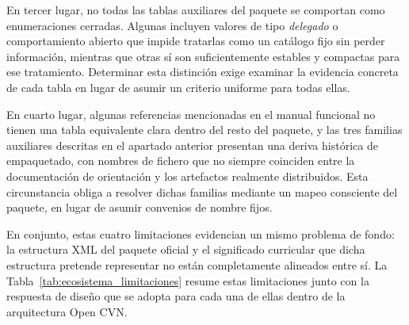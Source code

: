 En tercer lugar, no todas las tablas auxiliares del paquete se comportan como
enumeraciones cerradas. Algunas incluyen valores de tipo \emph{delegado} o
comportamiento abierto que impide tratarlas como un catálogo fijo sin perder
información, mientras que otras sí son suficientemente estables y compactas
para ese tratamiento. Determinar esta distinción exige examinar la evidencia
concreta de cada tabla en lugar de asumir un criterio uniforme para todas ellas.

En cuarto lugar, algunas referencias mencionadas en el manual funcional no
tienen una tabla equivalente clara dentro del resto del paquete, y las tres
familias auxiliares descritas en el apartado anterior presentan una deriva
histórica de empaquetado, con nombres de fichero que no siempre coinciden entre
la documentación de orientación y los artefactos realmente distribuidos. Esta
circunstancia obliga a resolver dichas familias mediante un mapeo consciente
del paquete, en lugar de asumir convenios de nombre fijos.

En conjunto, estas cuatro limitaciones evidencian un mismo problema de fondo:
la estructura XML del paquete oficial y el significado curricular que dicha
estructura pretende representar no están completamente alineados entre sí. La
Tabla~\ref{tab:ecosistema_limitaciones} resume estas limitaciones junto con la
respuesta de diseño que se adopta para cada una de ellas dentro de la
arquitectura Open CVN.

